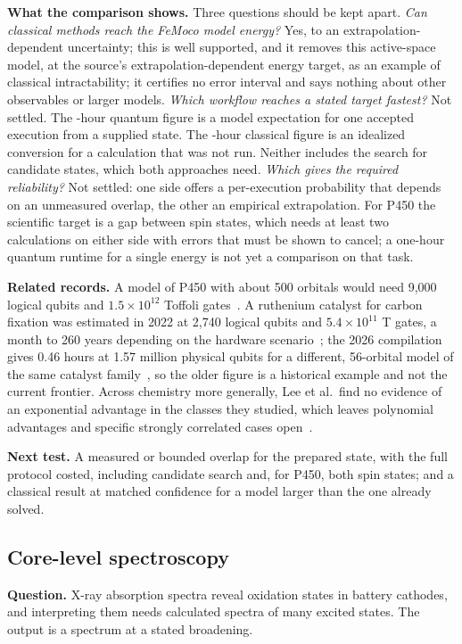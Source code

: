 \textbf{What the comparison shows.} Three questions should be kept apart. \emph{Can classical methods reach the FeMoco model energy?} Yes, to an extrapolation-dependent uncertainty; this is well supported, and it removes this active-space model, at the source's extrapolation-dependent energy target, as an example of classical intractability; it certifies no error interval and says nothing about other observables or larger models. \emph{Which workflow reaches a stated target fastest?} Not settled. The \femoT-hour quantum figure is a model expectation for one accepted execution from a supplied state. The \femoClassIdeal-hour classical figure is an idealized conversion for a calculation that was not run. Neither includes the search for candidate states, which both approaches need. \emph{Which gives the required reliability?} Not settled: one side offers a per-execution probability that depends on an unmeasured overlap, the other an empirical extrapolation. For P450 the scientific target is a gap between spin states, which needs at least two calculations on either side with errors that must be shown to cancel; a one-hour quantum runtime for a single energy is not yet a comparison on that task.

\textbf{Related records.} A model of P450 with about 500 orbitals would need 9{,}000 logical qubits and $1.5\times10^{12}$ Toffoli gates~\cite{goings2022}. A ruthenium catalyst for carbon fixation was estimated in 2022 at 2{,}740 logical qubits and $5.4\times10^{11}$ T gates, a month to 260 years depending on the hardware scenario~\cite{beverland2022}; the 2026 compilation gives 0.46 hours at 1.57 million physical qubits for a different, 56-orbital model of the same catalyst family~\cite{low2026dense}, so the older figure is a historical example and not the current frontier. Across chemistry more generally, Lee et al.\ find no evidence of an exponential advantage in the classes they studied, which leaves polynomial advantages and specific strongly correlated cases open~\cite{lee2023}.

\textbf{Next test.} A measured or bounded overlap for the prepared state, with the full protocol costed, including candidate search and, for P450, both spin states; and a classical result at matched confidence for a model larger than the one already solved.

\subsection{Core-level spectroscopy}
\label{sec:xas}
\textbf{Question.} X-ray absorption spectra reveal oxidation states in battery cathodes, and interpreting them needs calculated spectra of many excited states. The output is a spectrum at a stated broadening.

